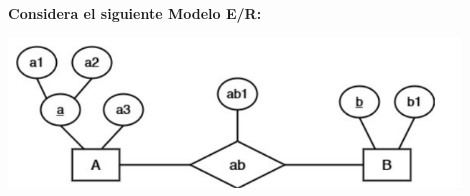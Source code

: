 \textbf{Considera el siguiente Modelo E/R:}\vspace{.3cm}

\begin{center}
    \includegraphics[width=12cm]{conversion/../resources/3.png}
\end{center}

\vspace{.5cm}
